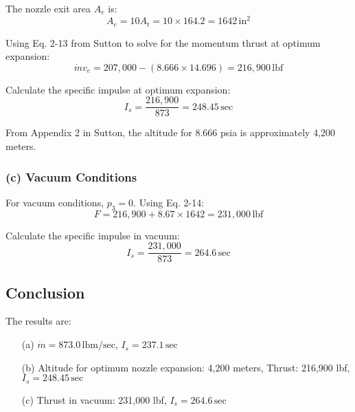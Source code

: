 \documentclass{article}
\begin{document}
The nozzle exit area $A_e$ is:
\[
A_e = 10 A_t = 10 \times 164.2 = 1642 \, \text{in}^2
\]

Using Eq. 2-13 from Sutton to solve for the momentum thrust at optimum expansion:
\[
\dot{m} v_e = 207,000 - (8.666 \times 14.696) = 216,900 \, \text{lbf}
\]

Calculate the specific impulse at optimum expansion:
\[
I_s = \frac{216,900}{873} = 248.45 \, \text{sec}
\]

From Appendix 2 in Sutton, the altitude for 8.666 psia is approximately 4,200 meters.

\subsubsection{(c) Vacuum Conditions}

For vacuum conditions, $p_3 = 0$. Using Eq. 2-14:
\[
F = 216,900 + 8.67 \times 1642 = 231,000 \, \text{lbf}
\]

Calculate the specific impulse in vacuum:
\[
I_s = \frac{231,000}{873} = 264.6 \, \text{sec}
\]

\subsection{Conclusion}
The results are:
\begin{itemize}
    \item[(a)] $\dot{m} = 873.0 \, \text{lbm/sec}$, $I_s = 237.1 \, \text{sec}$
    \item[(b)] Altitude for optimum nozzle expansion: 4,200 meters, Thrust: 216,900 lbf, $I_s = 248.45 \, \text{sec}$
    \item[(c)] Thrust in vacuum: 231,000 lbf, $I_s = 264.6 \, \text{sec}$
\end{itemize}
\end{document}
